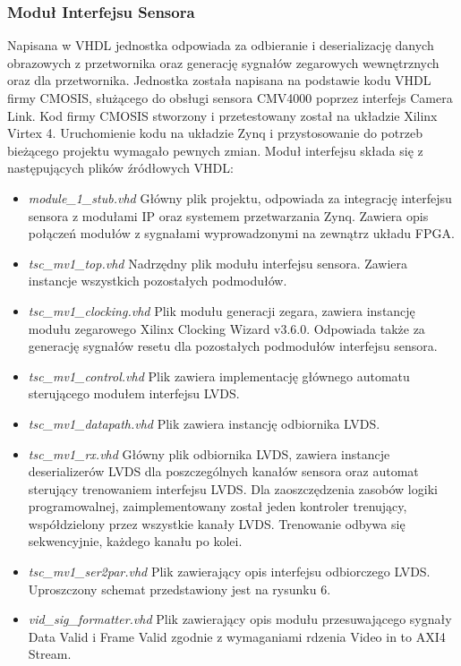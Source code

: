 \documentclass[a4paper,11pt,oneside]{report}  %
\begin{document}
\subsubsection{Moduł Interfejsu Sensora}
Napisana w VHDL jednostka odpowiada za odbieranie i deserializację danych obrazowych z przetwornika oraz generację sygnałów zegarowych wewnętrznych oraz dla przetwornika. Jednostka została napisana na podstawie kodu VHDL firmy CMOSIS, służącego do obsługi sensora CMV4000 poprzez interfejs Camera Link. Kod firmy CMOSIS stworzony i przetestowany został na układzie Xilinx Virtex 4. Uruchomienie kodu na układzie Zynq i przystosowanie do potrzeb bieżącego projektu wymagało pewnych zmian.
Moduł interfejsu składa się z następujących plików źródłowych VHDL:
\begin{itemize}
\item  \textit{module\_1\_stub.vhd} Główny plik projektu, odpowiada za integrację interfejsu sensora z modułami IP oraz systemem przetwarzania Zynq. Zawiera opis połączeń modułów z sygnałami wyprowadzonymi na zewnątrz układu FPGA.

\item \textit{tsc\_mv1\_top.vhd} Nadrzędny plik modułu interfejsu sensora. Zawiera instancje wszystkich pozostałych podmodułów.

\item \textit{tsc\_mv1\_clocking.vhd} Plik modułu generacji zegara, zawiera instancję modułu zegarowego Xilinx Clocking Wizard v3.6.0. Odpowiada także za generację sygnałów resetu dla pozostałych podmodułów interfejsu sensora.

\item \textit{tsc\_mv1\_control.vhd} Plik zawiera implementację głównego automatu sterującego modułem interfejsu LVDS.

\item \textit{tsc\_mv1\_datapath.vhd} Plik zawiera instancję odbiornika LVDS.

\item \textit{tsc\_mv1\_rx.vhd} Główny plik odbiornika LVDS, zawiera instancje deserializerów LVDS dla poszczególnych kanałów sensora oraz automat sterujący trenowaniem interfejsu LVDS. Dla zaoszczędzenia zasobów logiki programowalnej, zaimplementowany został jeden kontroler trenujący, współdzielony przez wszystkie kanały LVDS. Trenowanie odbywa się sekwencyjnie, każdego kanału po kolei.

\item \textit{tsc\_mv1\_ser2par.vhd} Plik zawierający opis interfejsu odbiorczego LVDS. Uproszczony schemat przedstawiony jest na rysunku 6.

\item \textit{vid\_sig\_formatter.vhd} Plik zawierający opis modułu przesuwającego sygnały Data Valid i Frame Valid zgodnie z wymaganiami rdzenia Video in to AXI4 Stream.
\end{itemize}
\end{document}
